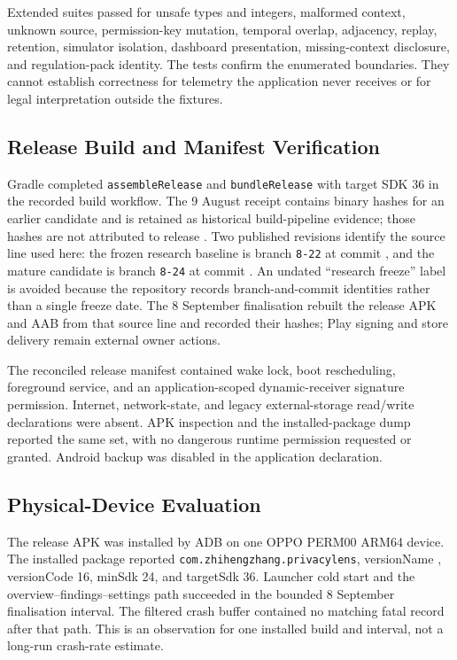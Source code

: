 Extended suites passed for unsafe types and integers, malformed context, unknown source, permission-key mutation, temporal overlap, adjacency, replay, retention, simulator isolation, dashboard presentation, missing-context disclosure, and regulation-pack identity. The tests confirm the enumerated boundaries. They cannot establish correctness for telemetry the application never receives or for legal interpretation outside the fixtures.

\subsection{Release Build and Manifest Verification}

Gradle completed \texttt{assembleRelease} and \texttt{bundleRelease} with target SDK 36 in the recorded build workflow. The 9 August receipt contains binary hashes for an earlier candidate and is retained as historical build-pipeline evidence; those hashes are not attributed to release \PrivacyLensVersion{}. Two published revisions identify the source line used here: the frozen research baseline is branch \texttt{8-22} at commit , and the mature candidate is branch \texttt{8-24} at commit . An undated ``research freeze'' label is avoided because the repository records branch-and-commit identities rather than a single freeze date. The 8 September finalisation rebuilt the release APK and AAB from that source line and recorded their hashes; Play signing and store delivery remain external owner actions.

The reconciled release manifest contained wake lock, boot rescheduling, foreground service, and an application-scoped dynamic-receiver signature permission. Internet, network-state, and legacy external-storage read/write declarations were absent. APK inspection and the installed-package dump reported the same set, with no dangerous runtime permission requested or granted. Android backup was disabled in the application declaration.

\subsection{Physical-Device Evaluation}

The release APK was installed by ADB on one OPPO PERM00 ARM64 device. The installed package reported \texttt{com.zhihengzhang.privacylens}, versionName \PrivacyLensVersion{}, versionCode 16, minSdk 24, and targetSdk 36. Launcher cold start and the overview--findings--settings path succeeded in the bounded 8 September finalisation interval. The filtered crash buffer contained no matching fatal record after that path. This is an observation for one installed build and interval, not a long-run crash-rate estimate.

